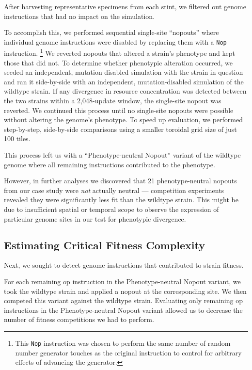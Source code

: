 After harvesting representative specimens from each stint, we filtered out genome instructions that had no impact on the simulation.

To accomplish this, we performed sequential single-site ``nopouts'' where individual genome instructions were disabled by replacing them with a \texttt{Nop} instruction.
\footnote{
This \texttt{Nop} instruction was chosen to perform the same number of random number generator touches as the original instruction to control for arbitrary effects of advancing the generator.
}
We reverted nopouts that altered a strain's phenotype and kept those that did not.
To determine whether phenotypic alteration occurred, we seeded an independent, mutation-disabled simulation with the strain in question and ran it side-by-side with an independent, mutation-disabled simulation of the wildtype strain.
If any divergence in resource concentration was detected between the two strains within a 2,048-update window, the single-site nopout was reverted.
We continued this process until no single-site nopouts were possible without altering the genome's phenotype.
To speed up evaluation, we performed step-by-step, side-by-side comparisons using a smaller toroidal grid size of just 100 tiles.

This process left us with a ``Phenotype-neutral Nopout'' variant of the wildtype genome where all remaining instructions contributed to the phenotype.

However, in further analyses we discovered that 21 phenotype-neutral nopouts from our case study were \textit{not} actually neutral --- competition experiments revealed they were significantly less fit than the wildtype strain.
This might be due to insufficient spatial or temporal scope to observe the expression of particular genome sites in our test for phenotypic divergence.

\subsection{Estimating Critical Fitness Complexity}

Next, we sought to detect genome instructions that contributed to strain fitness.

For each remaining op instruction in the Phenotype-neutral Nopout variant, we took the wildtype strain and applied a nopout at the corresponding site.
We then competed this variant against the wildtype strain.
Evaluating only remaining op instructions in the Phenotype-neutral Nopout variant allowed us to decrease the number of fitness competitions we had to perform.

